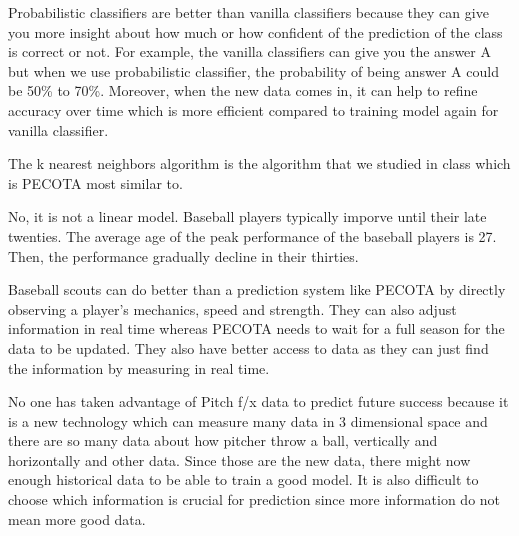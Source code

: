 \documentclass[12pt]{article}
\begin{document}
\begin{enumerate}
Probabilistic classifiers are better than vanilla classifiers because they can give you more insight about how much or how confident of the prediction of the class is correct or not. For example, the vanilla classifiers can give you the answer A but when we use probabilistic classifier, the probability of being answer A could be 50\% to 70\%. Moreover, when the new data comes in, it can help to refine accuracy over time which is more efficient compared to training model again for vanilla classifier.



The k nearest neighbors algorithm is the algorithm that we studied in class which is PECOTA most similar to.


No, it is not a linear model.  Baseball players typically imporve until their late twenties. The average age of the peak performance of the baseball players is 27. Then, the performance gradually decline in their thirties. 


Baseball scouts can do better than a prediction system like PECOTA by directly observing a player's mechanics, speed and strength. They can also adjust information in real time whereas PECOTA needs to wait for a full season for the data to be updated. They also have better access to data as they can just find the information by measuring in real time.



No one has taken advantage of Pitch f/x data to predict future success because it is a new technology which can measure many data in 3 dimensional space and there are so many data about how pitcher throw a ball, vertically and horizontally and other data. Since those are the new data, there might now enough historical data to be able to train a good model. It is also difficult to choose which information is crucial for prediction since more information do not mean more good data. 


\end{enumerate}
\end{document}
